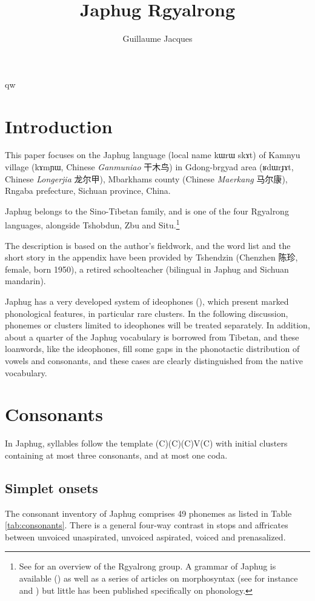 qw\documentclass[oldfontcommands,oneside,a4paper,11pt]{article}
\newcommand{\ipa}[1]{{\phon #1}} %
\newcommand{\zh}[1]{{\cn #1}}
\begin{document}
 

\title{Japhug Rgyalrong}
\author{Guillaume Jacques}
\maketitle
\linenumbers
 \section{Introduction}
 This paper focuses on the Japhug language (local name \ipa{kɯrɯ skɤt}) of Kamnyu village (\ipa{kɤmɲɯ}, Chinese \textit{Ganmuniao} \zh{干木鸟}) in Gdong-brgyad area (\ipa{ʁdɯrɟɤt}, Chinese  \textit{Longerjia} \zh{龙尔甲}), Mbarkhams county (Chinese \textit{Maerkang} \zh{马尔康}), Rngaba prefecture, Sichuan province, China.
 
 Japhug belongs to the Sino-Tibetan family, and is one of the four Rgyalrong languages, alongside Tshobdun, Zbu and Situ.\footnote{See  \citet{jackson00sidaba} for an overview of the Rgyalrong group. A grammar of Japhug is available (\citealt{jacques08}) as well as a series of articles on morphosyntax (see for instance  \citealt{jacques13harmonization} and
 \citealt{jacques14antipassive}) but little has been published specifically on phonology. } 
 
The description is based on the author’s fieldwork, and the word list and the short story in the appendix have been provided by Tshendzin (Chenzhen \zh{陈珍}, female, born 1950), a retired schoolteacher (bilingual in Japhug and Sichuan mandarin).

 Japhug has a very developed system of ideophones (\citealt{japhug14ideophones}), which present marked phonological features, in particular rare clusters. In the following discussion, phonemes or clusters limited to ideophones will be treated separately. In addition, about a quarter of the Japhug vocabulary is borrowed from Tibetan, and these loanwords, like the ideophones, fill some gaps in the phonotactic distribution of vowels and consonants, and these cases are clearly distinguished from the native vocabulary.

 
 \section{Consonants}
 In Japhug, syllables follow the template (C)(C)(C)V(C) with initial clusters containing at most three consonants, and at most one coda.
 
 \subsection{Simplet onsets}
 The consonant inventory of Japhug comprises 49 phonemes as listed in Table \ref{tab:consonants}. There is a general four-way contrast in stops and affricates between unvoiced unaspirated, unvoiced aspirated, voiced and prenasalized.
 
\end{document}
